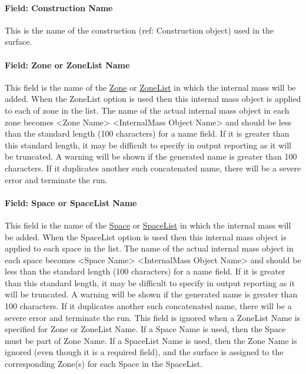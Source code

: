 \paragraph{Field: Construction Name}\label{field-construction-name-21}

This is the name of the construction (ref: Construction object) used in the surface.

\paragraph{Field: Zone or ZoneList Name}\label{field-zone-or-zonelist-name-14}

This field is the name of the \hyperref[zone]{Zone} or \hyperref[zonelist]{ZoneList} in which the internal mass will be added. When the ZoneList option is used then this internal mass object is applied to each of zone in the list. The name of the actual internal mass object in each zone becomes <Zone Name> <InternalMass Object Name> and should be less than the standard length (100 characters) for a name field. If it is greater than this standard length, it may be difficult to specify in output reporting as it will be truncated. A warning will be shown if the generated name is greater than 100 characters. If it duplicates another such concatenated name, there will be a severe error and terminate the run.

\paragraph{Field: Space or SpaceList Name}\label{field-space-or-spacelist-name-14}

This field is the name of the \hyperref[space]{Space} or \hyperref[spacelist]{SpaceList} in which the internal mass will be added. When the SpaceList option is used then this internal mass object is applied to each space in the list. The name of the actual internal mass object in each space becomes <Space Name> <InternalMass Object Name> and should be less than the standard length (100 characters) for a name field. If it is greater than this standard length, it may be difficult to specify in output reporting as it will be truncated. A warning will be shown if the generated name is greater than 100 characters. If it duplicates another such concatenated name, there will be a severe error and terminate the run. This field is ignored when a ZoneList Name is specified for Zone or ZoneList Name. If a Space Name is used, then the Space must be part of Zone Name. If a SpaceList Name is used, then the Zone Name is ignored (even though it is a required field), and the surface is assigned to the corresponding Zone(s) for each Space in the SpaceList.

